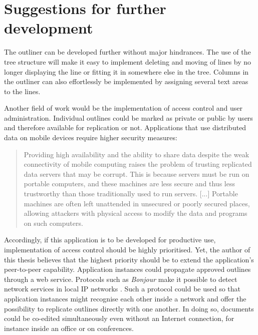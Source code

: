 \section{Suggestions for further development}

The outliner can be developed further without major hindrances. The use of the tree structure will make it easy to implement deleting and moving of lines by no longer displaying the line or fitting it in somewhere else in the tree. Columns in the outliner can also effortlessly be implemented by assigning several text areas to the lines.

Another field of work would be the implementation of access control and user administration. Individual outlines could be marked as private or public by users and therefore available for replication or not. Applications that use distributed data on mobile devices require higher security measures:

\begin{quote}
Providing high availability and the ability to share data despite the weak connectivity of mobile computing raises the problem of trusting replicated data servers that may be corrupt. This is because servers must be run on portable computers, and these machines are less secure and thus less trustworthy than those traditionally used to run servers. [...] Portable machines are often left unattended in unsecured or poorly secured places, allowing attackers with physical access to modify the data and programs on such computers. 
\end{quote}

Accordingly, if this application is to be developed for productive use, implementation of access control should be highly prioritised. Yet, the author of this thesis believes that the highest priority should be to extend the application's peer-to-peer capability. Application instances could propagate approved outlines through a web service. Protocols such as \textit{Bonjour} make it possible to detect network services in local IP networks \cite{bonjour:website}. Such a protocol could be used so that application instances might recognise each other inside a network and offer the possibility to replicate outlines directly with one another. In doing so, documents could be co-edited simultaneously even without an Internet connection, for instance inside an office or on conferences.
 
